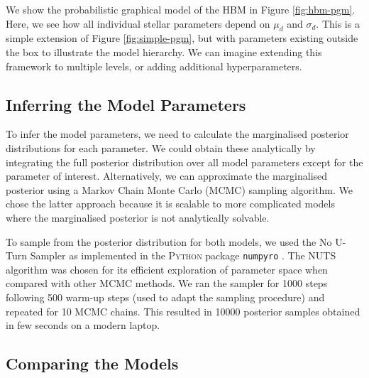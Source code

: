 We show the probabilistic graphical model of the HBM in Figure \ref{fig:hbm-pgm}. Here, we see how all individual stellar parameters depend on \(\mu_d\) and \(\sigma_d\). This is a simple extension of Figure \ref{fig:simple-pgm}, but with parameters existing outside the box to illustrate the model hierarchy. We can imagine extending this framework to multiple levels, or adding additional hyperparameters.

\subsection{Inferring the Model Parameters}\label{sec:hbm-inf}

To infer the model parameters, we need to calculate the marginalised posterior distributions for each parameter. We could obtain these analytically by integrating the full posterior distribution over all model parameters except for the parameter of interest. Alternatively, we can approximate the marginalised posterior using a Markov Chain Monte Carlo (MCMC) sampling algorithm. We chose the latter approach because it is scalable to more complicated models where the marginalised posterior is not analytically solvable.

To sample from the posterior distribution for both models, we used the No U-Turn Sampler \citep[NUTS;][]{Hoffman.Gelman2014} as implemented in the \textsc{Python} package \texttt{numpyro} \citep{Phan.Pradhan.ea2019,Bingham.Chen.ea2019}. The NUTS algorithm was chosen for its efficient exploration of parameter space when compared with other MCMC methods. We ran the sampler for 1000 steps following 500 warm-up steps (used to adapt the sampling procedure) and repeated for 10 MCMC chains.
This resulted in \num{10000} posterior samples obtained in few seconds on a modern laptop.

\subsection{Comparing the Models}\label{sec:hbm-comp}

